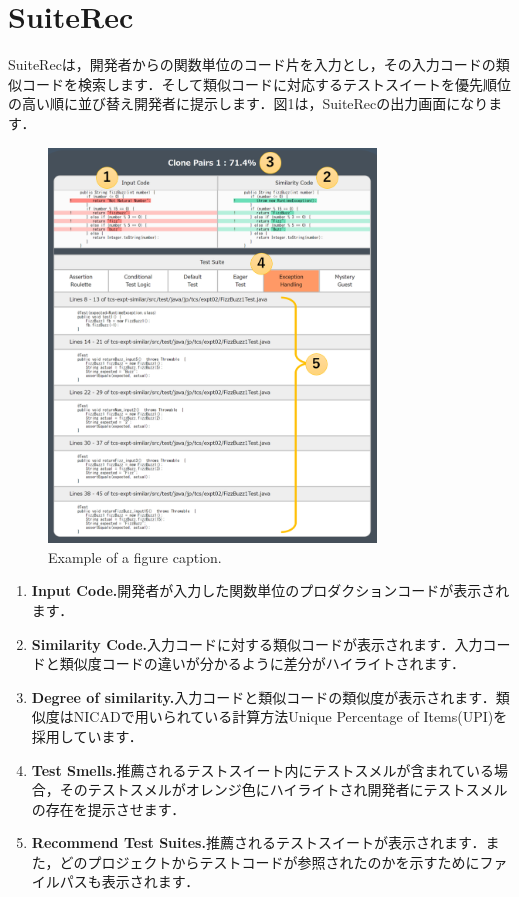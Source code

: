 \documentclass[conference]{IEEEtran}
\begin{document}
\section{SuiteRec}
SuiteRecは，開発者からの関数単位のコード片を入力とし，その入力コードの類似コードを検索します．そして類似コードに対応するテストスイートを優先順位の高い順に並び替え開発者に提示します．図1は，SuiteRecの出力画面になります．

\begin{figure}[htbp]
\centerline{\includegraphics[width=8.7cm]{SuiteRec.pdf}}
\caption{Example of a figure caption.}
\label{fig}
\end{figure}

 \begin{enumerate}
\renewcommand{\labelenumi}{\textcircled{\scriptsize \theenumi}}
\item{\textbf{Input Code.}開発者が入力した関数単位のプロダクションコードが表示されます．}
\item{\textbf{Similarity Code.}入力コードに対する類似コードが表示されます．入力コードと類似度コードの違いが分かるように差分がハイライトされます．}
\item{\textbf{Degree of similarity.}入力コードと類似コードの類似度が表示されます．類似度はNICADで用いられている計算方法Unique Percentage of Items(UPI)を採用しています．}
\item{\textbf{Test Smells.}推薦されるテストスイート内にテストスメルが含まれている場合，そのテストスメルがオレンジ色にハイライトされ開発者にテストスメルの存在を提示させます．}
\item{\textbf{Recommend Test Suites.}推薦されるテストスイートが表示されます．また，どのプロジェクトからテストコードが参照されたのかを示すためにファイルパスも表示されます．}
\end{enumerate}
\end{document}
